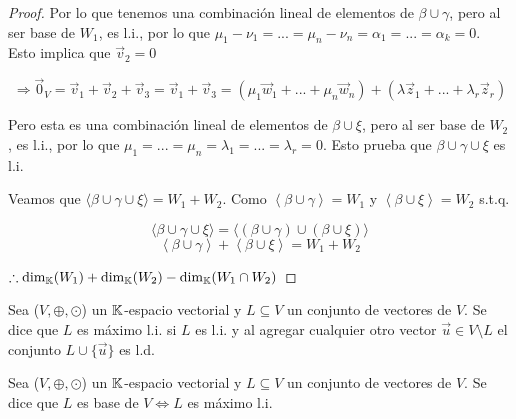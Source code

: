 \begin{proof}
    Por lo que tenemos una combinación lineal de elementos de $\beta \cup \gamma$, pero al ser base de $W_1$, es l.i., por lo que $\mu_1-\nu_1 = ... = \mu_n-\nu_n = \alpha_1 = ... = \alpha_k = 0$. Esto implica que $\vec{v}_2 = 0$

    $$\Rightarrow \vec{0}_V = \vec{v}_1 + \vec{v}_2 + \vec{v}_3 = \vec{v}_1 + \vec{v}_3 = (\mu_1 \vec{w}_1 +  ... + \mu_n \vec{w}_n) + (\lambda \vec{z}_1 +  ... + \lambda_r \vec{z}_r)$$

    Pero esta es una combinación lineal de elementos de $\beta \cup \xi$, pero al ser base de $W_2 $, es l.i., por lo que $\mu_1 = ... = \mu_n = \lambda_1 = ... = \lambda_r = 0$. Esto prueba que $\beta \cup \gamma \cup \xi$ es l.i.

    Veamos que $\langle \beta \cup \gamma \cup \xi \rangle = W_1 + W_2$. Como $\left\langle \beta \cup \gamma \right\rangle = W_1$ y  $\left\langle \beta \cup \xi \right\rangle = W_2$ s.t.q.

    $$ \langle \beta \cup \gamma \cup \xi \rangle = \langle (\beta \cup \gamma) \cup (\beta \cup \xi )\rangle$$
    $$\left\langle \beta \cup \gamma \right\rangle + \left\langle \beta \cup \xi \right\rangle = W_1 + W_2$$
    
    $\therefore {\dim}_{\mathbb{K}}(W_1) + {\dim}_{\mathbb{K}}(W_2) - {\dim}_{\mathbb{K}}(W_1 \cap W_2)$

\end{proof}


\begin{definition}
    Sea ($V, \oplus, \odot$) un $\mathbb{K}$-espacio vectorial y $L \subseteq V$ un conjunto de vectores de $V$. Se dice que $L$ es máximo l.i. si $L$ es l.i. y al agregar cualquier otro vector $\vec{u} \in V \setminus L$ el conjunto $L \cup \{ \vec{u} \}$ es l.d.
\end{definition}

\begin{theorem} \label{theom124}
    Sea ($V, \oplus, \odot$) un $\mathbb{K}$-espacio vectorial y $L \subseteq V$ un conjunto de vectores de $V$. Se dice que $L$ es base de $V \iff L$ es máximo l.i.
\end{theorem}

